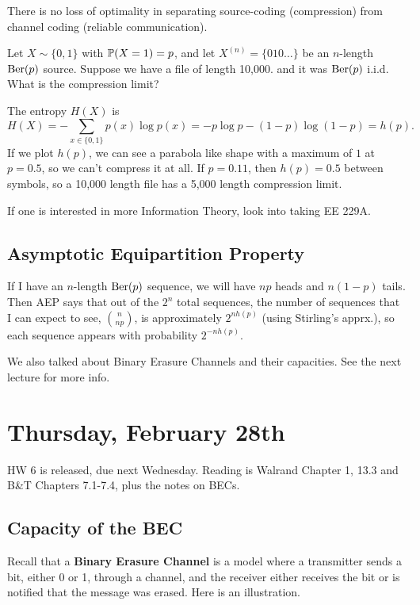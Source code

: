 \documentclass[11 pt]{scrartcl}
\begin{document}
\begin{theorem}[Separation]
    There is no loss of optimality in separating source-coding (compression) from channel coding (reliable communication). 
\end{theorem}

\begin{example}
    Let $X\sim\{0,1\}$ with $\mathbb P(X=1) = p$, and let $X^{(n)} = \{010\dots\}$ be an $n$-length $\text{Ber}(p)$ source. Suppose we have a file of length 10,000. and it was $\text{Ber}(p)$ i.i.d. What is the compression limit?  

    The entropy $H(X)$ is 
    \[ H(X) = -\sum_{x\in\{0,1\}}p(x) \log p(x) = -p\log p - (1-p)\log(1-p) = h(p).\] 
    If we plot $h(p)$, we can see a parabola like shape with a maximum of $1$ at $p = 0.5$, so we can't compress it at all. If $p = 0.11$, then $h(p) = 0.5$ between symbols, so a 10,000 length file has a 5,000 length compression limit. 
\end{example}

If one is interested in more Information Theory, look into taking EE 229A. 

\subsection{Asymptotic Equipartition Property}
If I have an $n$-length $\text{Ber}(p)$ sequence, we will have $np$ heads and $n(1-p)$ tails. Then AEP says that out of the $2^n$ total sequences, the number of sequences that I can expect to see, $\binom{n}{np}$, is approximately $2^{n h(p)}$ (using Stirling's apprx.), so each sequence appears with probability $2^{-n h(p)}$. 

We also talked about Binary Erasure Channels and their capacities. See the next lecture for more info. 

\newpage
\section{Thursday, February 28th}
HW 6 is released, due next Wednesday. Reading is Walrand Chapter 1, 13.3 and B\&T Chapters 7.1-7.4, plus the notes on BECs. 

\subsection{Capacity of the BEC}
Recall that a \textbf{Binary Erasure Channel} is a model where a transmitter sends a bit, either 0 or 1, through a channel, and the receiver either receives the bit or is notified that the message was erased. Here is an illustration. 
\end{document}
